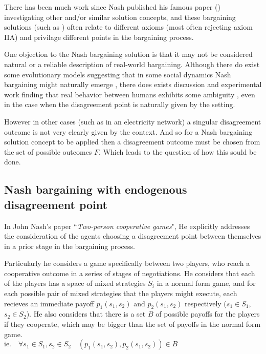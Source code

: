 There has been much work since Nash published his famous paper (\cite{nash1}) investigating other and/or similar solution concepts, and these bargaining solutions (such as \cite{smorodinsky,tempered,tale1,anbarci2002comparing}) often relate to different axioms (most often rejecting axiom IIA) and privilage different points in the bargaining process.

One objection to the Nash bargaining solution is that it may not be considered natural or a reliable description of real-world bargaining.
Although there do exist some evolutionary models suggesting that in some social dynamics Nash bargaining might naturally emerge \cite{articlechoakihiko}, there does exists discussion and experimental work finding that real behavior between humans exhibits some ambiguity \cite{KROLL2014261}, even in the case when the disagreement point is naturally given by the setting.

However in other cases (such as in an electricity network) a singular disagreement outcome is not very clearly given by the context.
And so for a Nash bargaining solution concept to be applied then a disagreement outcome must be chosen from the set of possible outcomes $F$.
Which leads to the question of how this sould be done.

\subsection{Nash bargaining with endogenous disagreement point}

In John Nash's paper ``\textit{Two-person cooperative games}"\cite{nash2}, He explicitly addresses the consideration of the agents choosing a disagreement point between themselves in a prior stage in the bargaining process.

Particularly he considers a game specifically between two players, who reach a cooperative outcome in a series of stages of negotiations.
He considers that each of the players has a space of mixed strategies $S_i$ in a normal form game, and for each possible pair of mixed strategies that the players might execute, each recieves an immediate payoff $p_1(s_1,s_2)$ and $p_2(s_1,s_2)$ respectively ($s_1\in S_1$, $s_2\in S_2$).
He also considers that there is a set $B$ of possible payoffs for the players if they cooperate, which may be bigger than the set of payoffs in the normal form game.\\
$\text{ie.}\quad \forall s_1\in S_1,s_2\in S_2 \quad (p_1(s_1,s_2), p_2(s_1,s_2)) \in B$

